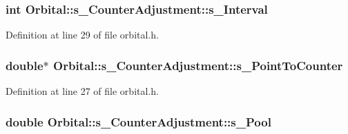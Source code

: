 \subsubsection[{\texorpdfstring{s\+\_\+\+Interval}{s_Interval}}]{\setlength{\rightskip}{0pt plus 5cm}int Orbital\+::s\+\_\+\+Counter\+Adjustment\+::s\+\_\+\+Interval}\hypertarget{struct_orbital_1_1s___counter_adjustment_abd239df7e874f967b5bfcc299f26d248}{}\label{struct_orbital_1_1s___counter_adjustment_abd239df7e874f967b5bfcc299f26d248}


Definition at line 29 of file orbital.\+h.

\subsubsection[{\texorpdfstring{s\+\_\+\+Point\+To\+Counter}{s_PointToCounter}}]{\setlength{\rightskip}{0pt plus 5cm}double$\ast$ Orbital\+::s\+\_\+\+Counter\+Adjustment\+::s\+\_\+\+Point\+To\+Counter}\hypertarget{struct_orbital_1_1s___counter_adjustment_aff9f1b4f297f8f569eb706971508caef}{}\label{struct_orbital_1_1s___counter_adjustment_aff9f1b4f297f8f569eb706971508caef}


Definition at line 27 of file orbital.\+h.

\subsubsection[{\texorpdfstring{s\+\_\+\+Pool}{s_Pool}}]{\setlength{\rightskip}{0pt plus 5cm}double Orbital\+::s\+\_\+\+Counter\+Adjustment\+::s\+\_\+\+Pool}\hypertarget{struct_orbital_1_1s___counter_adjustment_ad1ef7d871a1a95a5cc889e44a210ce1a}{}\label{struct_orbital_1_1s___counter_adjustment_ad1ef7d871a1a95a5cc889e44a210ce1a}


